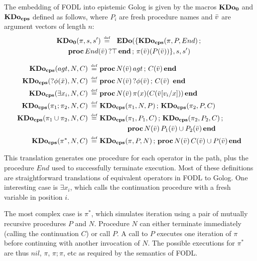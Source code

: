 \begin{defnL}
 The embedding of FODL into epistemic
Golog is given by the macros $\mathbf{KDo_{0}}$ and $\mathbf{KDo_{cps}}$ defined as follows,
where $P_{i}$ are fresh procedure names and $\bar{v}$ are argument
vectors of length $n$:\begin{multline*}
\mathbf{KDo_{0}}(\pi,s,s')\,\stackrel{\mbox{\tiny def}}{=}\,\,\ \mathbf{EDo}(\{\mathbf{KDo_{cps}}(\pi,P,End)\,;\,\\
\mathbf{proc}\, End(\bar{v})\,?\top\,\mathbf{end}\,;\,\pi(\bar{v})(P(\bar{v}))\},s,s')\end{multline*}

\end{defnL}
\begin{align*}
\mathbf{KDo_{cps}}(agt,N,C)\,\stackrel{\mbox{\tiny def}}{=}\,\, & \mathbf{proc}\, N(\bar{v})\, agt\,;\, C(\bar{v})\,\mathbf{end}\\
\mathbf{KDo_{cps}}(?\phi(\bar{x}),N,C)\,\stackrel{\mbox{\tiny def}}{=}\,\, & \mathbf{proc}\, N(\bar{v})\,?\phi(\bar{v})\,;\, C(\bar{v})\,\ \mathbf{end}\\
\mathbf{KDo_{cps}}(\exists x_{i},N,C)\,\stackrel{\mbox{\tiny def}}{=}\,\, & \mathbf{proc}\, N(\bar{v})\,\pi(x)(C(\bar{v}[v_{i}/x]))\,\mathbf{end}\\
\mathbf{KDo_{cps}}(\pi_{1};\pi_{2},N,C)\,\stackrel{\mbox{\tiny def}}{=}\,\, & \mathbf{KDo_{cps}}(\pi_{1},N,P)\,;\,\mathbf{KDo_{cps}}(\pi_{2},P,C)\\
\mathbf{KDo_{cps}}(\pi_{1}\cup\pi_{2},N,C)\,\stackrel{\mbox{\tiny def}}{=}\,\, & \mathbf{KDo_{cps}}(\pi_{1},P_{1},C)\,;\,\mathbf{KDo_{cps}}(\pi_{2},P_{2},C)\,;\\
 & \,\mathbf{\,\,\,\,\,\,\,\,\,\,\,\,\,\,\,\,\,\,\,\,\,\,\, proc}\, N(\bar{v})\, P_{1}(\bar{v})\cup P_{2}(\bar{v})\,\mathbf{end}\\
\mathbf{KDo_{cps}}(\pi^{*},N,C)\,\stackrel{\mbox{\tiny def}}{=}\,\, & \mathbf{KDo_{cps}}(\pi,P,N)\,;\,\mathbf{proc}\, N(\bar{v})\, C(\bar{v})\cup P(\bar{v})\,\mathbf{end}\end{align*}


This translation generates one procedure for each operator in the
path, plus the procedure $End$ used to successfully terminate execution.
Most of these definitions are straightforward translations of equivalent
operators in FODL to Golog. One interesting case is $\exists x_{i}$,
which calls the continuation procedure with a fresh variable in position
$i$.

The most complex case is $\pi^{*}$, which simulates iteration using
a pair of mutually recursive procedures $P$ and $N$. Procedure $N$
can either terminate immediately (calling the continuation $C$) or
call $P$. A call to $P$ executes one iteration of $\pi$ before
continuing with another invocation of $N$. The possible executions
for $\pi^{*}$ are thus $nil$, $\pi$, $\pi;\pi$, etc as required
by the semantics of FODL.

